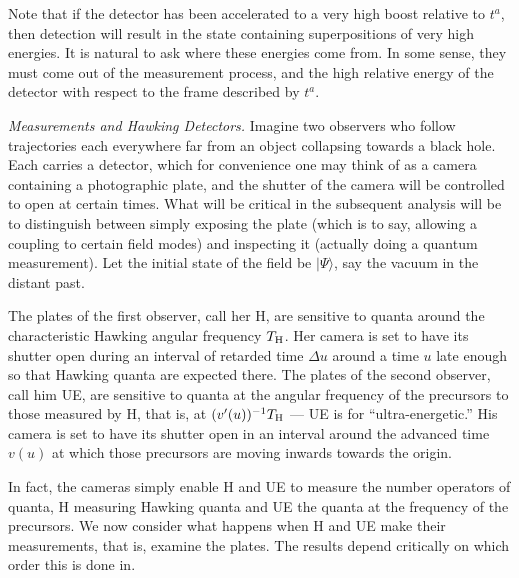 \documentclass[12pt]{article}
\begin{document}
Note that if the detector has been accelerated to a very high boost relative to $t^a$, then detection will result in the state containing superpositions of very high energies.  It is natural to ask where these energies come from.  In some sense, they must come out of the measurement process, and the high relative energy of the detector with respect to the frame described by $t^a$.  


{\em Measurements and Hawking Detectors.}
Imagine two observers who follow trajectories each everywhere far from an object collapsing towards a black hole.  Each carries a detector, which for convenience one may think of as a camera containing a photographic plate, and the shutter of the camera will be controlled to open at certain times.  What will be critical in the subsequent analysis will be to distinguish between simply exposing the plate (which is to say, allowing a coupling to certain field modes) and inspecting it (actually doing a quantum measurement).  Let the initial state of the field be $|\Psi\rangle$, say the vacuum in the distant past.

The plates of the first observer, call her H, are sensitive to quanta around the characteristic Hawking angular frequency $T_{\rm H}$.  Her camera is set to have its shutter open during an interval of retarded time $\Delta u$ around a time $u$ late enough so that Hawking quanta are expected there.  
The plates of the second observer, call him UE, are sensitive to quanta at the angular frequency of the precursors to those measured by H, that is, at $(v'(u))^{-1}T_{\rm H}$  --- UE is for ``ultra-energetic.''  His camera is set to have its shutter open in an interval around the advanced time $v(u)$ at which those precursors are moving inwards towards the origin.



In fact, the cameras simply enable H and UE to measure the number operators of quanta, H measuring Hawking quanta and UE the quanta at the frequency of the precursors.
We now consider what happens when H and UE make their measurements, that is, examine the plates.  The results depend critically on which order this is done in.
\end{document}
